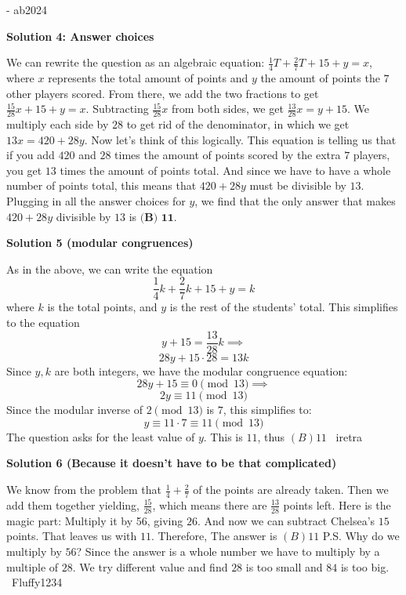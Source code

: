 \begin{enumerate}
 - ab2024

 



\textbf{Solution 4: Answer choices}

We can rewrite the question as an algebraic equation: $\frac{1}{4} T + \frac{2}{7} T + 15 + y = x$, where $x$ represents the total amount of points and $y$ the amount of points the $7$ other players scored. From there, we add the two fractions to get $\frac{15}{28} x + 15 + y = x$. Subtracting $\frac{15}{28} x$ from both sides, we get $\frac{13}{28} x = y + 15$. We multiply each side by $28$ to get rid of the denominator, in which we get $13x = 420 + 28y$. Now let’s think of this logically. This equation is telling us that if you add $420$ and $28$ times the amount of points scored by the extra $7$ players, you get $13$ times the amount of points total. And since we have to have a whole number of points total, this means that $420 + 28y$ must be divisible by $13$. Plugging in all the answer choices for $y$, we find that the only answer that makes $420 + 28y$ divisible by $13$ is $\boxed{ \textbf{(B) 11}}$.

 



\textbf{Solution 5 (modular congruences)}

As in the above, we can write the equation 
 \[\frac{1}{4}k+\frac{2}{7}k+15+y=k\]where $k$ is the total points, and $y$ is the rest of the students' total. This simplifies to the equation
 \[y+15=\frac{13}{28}k \implies\]
 \[28y+15 \cdot 28 = 13k\]Since $y,k$ are both integers, we have the modular congruence equation:
 \[28y+15 \equiv 0 \pmod{13} \implies\]
 \[2y \equiv 11 \pmod{13}\]Since the modular inverse of $2 \pmod{13}$ is $7$, this simplifies to:
 \[y \equiv 11 \cdot 7 \equiv 11 \pmod{13}\]The question asks for the least value of $y$. This is $11$, thus $\boxed{(B)11}$ 
 ~iretra

 



\textbf{Solution 6 (Because it doesn't have to be that complicated)}

We know from the problem that $\frac{1}{4} + \frac{2}{7}$ of the points are already taken. Then we add them together yielding, $\frac{15}{28}$, which means there are $\frac{13}{28}$ points left. Here is the magic part: Multiply it by 56, giving $26$. And now we can subtract Chelsea's $15$ points. That leaves us with $11$. Therefore, The answer is $\boxed{(B)11}$ 
P.S. Why do we multiply by $56$? Since the answer is a whole number we have to multiply by a multiple of $28$. We try different value and find $28$ is too small and $84$ is too big. 
~Fluffy1234


\end{enumerate}
